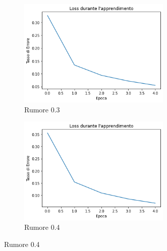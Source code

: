 \documentclass[12pt, a4paper]{article}
\begin{document}
\begin{figure}[H]
    \begin{subfigure}{0.5\textwidth}
        \centering
        \caption{Rumore 0.3}
        \includegraphics[width=0.80\textwidth]{Rumore3.png}
    \end{subfigure}    
    \begin{subfigure}{0.5\textwidth}
        \centering
        \caption{Rumore 0.4}
        \includegraphics[width=0.80\textwidth]{Rumore4.png}
    \end{subfigure}  
\end{figure}  
\end{document}
